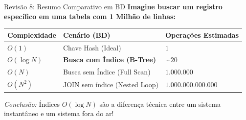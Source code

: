 \documentclass[9pt]{beamer}
\begin{document}
\begin{frame}{Revisão 8: Resumo Comparativo em BD}
    \textbf{Imagine buscar um registro específico em uma tabela com 1 Milhão de linhas:}
    
    \vspace{0.5cm}
    \begin{center}
    \renewcommand{\arraystretch}{1.5}
    \begin{tabular}{|l|l|l|}
        \hline
        \textbf{Complexidade} & \textbf{Cenário (BD)} & \textbf{Operações Estimadas} \\
        \hline
        $O(1)$ & Chave Hash (Ideal) & $1$ \\
        $O(\log N)$ & \textbf{Busca com Índice (B-Tree)} & \textbf{$\sim 20$} \\
        $O(N)$ & Busca sem Índice (Full Scan) & $1.000.000$ \\
        $O(N^2)$ & JOIN sem índice (Nested Loop) & $1.000.000.000.000$ \\
        \hline
    \end{tabular}
    \end{center}
    
    \vspace{0.3cm}
    \textit{Conclusão:} Índices $O(\log N)$ são a diferença técnica entre um sistema instantâneo e um sistema fora do ar!
\end{frame}
\end{document}
